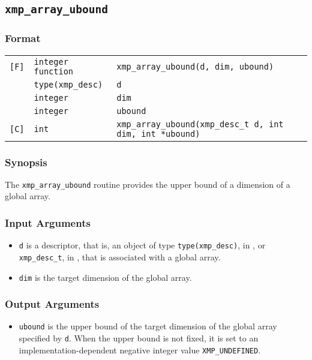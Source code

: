 \subsection{\tt xmp\_array\_ubound}

\subsubsection*{Format}

\begin{tabular}{lll}

\verb![F]!& {\tt integer function}& {\tt xmp\_array\_ubound(d, dim, ubound)}\\
          & {\tt type(xmp\_desc)} & {\tt d}\\
          & {\tt integer} & {\tt dim}\\
          & {\tt integer} & {\tt ubound}\\

\verb![C]!&  {\tt int}& {\tt xmp\_array\_ubound(xmp\_desc\_t d, int dim, int *ubound)}\\

\end{tabular}

\subsubsection*{Synopsis}

The {\tt xmp\_array\_ubound} routine provides the upper bound of a
dimension of a global array.

\subsubsection*{Input Arguments}
\begin{itemize}
 \item {\tt d} is a descriptor, that is, an object of type 
       {\tt type(xmp\_desc)}, in {\XMPF}, or {\tt xmp\_desc\_t},
       in {\XMPC}, that is associated with a global array.
 \item {\tt dim} is the target dimension of the global array.
\end{itemize}

\subsubsection*{Output Arguments}
\begin{itemize}
 \item {\tt ubound} is the upper bound of the target dimension of the
       global array specified by {\tt d}. When the upper bound is not
       fixed, it is set to an implementation-dependent negative integer
       value {\tt XMP\_UNDEFINED}.
\end{itemize}

